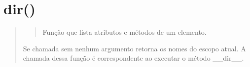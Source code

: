 \documentclass[letterpaper,10pt,brazil]{sphinxmanual}
\begin{document}
\begin{sphinxVerbatim}[commandchars=\\\{\}]
  
\end{sphinxVerbatim}

\begin{sphinxVerbatim}[commandchars=\\\{\}]
\end{sphinxVerbatim}

\begin{sphinxVerbatim}[commandchars=\\\{\}]
  
\end{sphinxVerbatim}

\begin{sphinxVerbatim}[commandchars=\\\{\}]
\end{sphinxVerbatim}

\begin{sphinxVerbatim}[commandchars=\\\{\}]
  
\end{sphinxVerbatim}

\begin{sphinxVerbatim}[commandchars=\\\{\}]
\end{sphinxVerbatim}


\section{dir()}
\label{\detokenize{content/built-ins:dir}}\begin{quote}
\begin{quote}

Função que lista atributos e métodos de um elemento.
\end{quote}

Se chamada sem nenhum argumento retorna os nomes do escopo atual.
A chamada dessa função é correspondente ao executar o método \_\_dir\_\_.
\end{quote}
\end{document}
